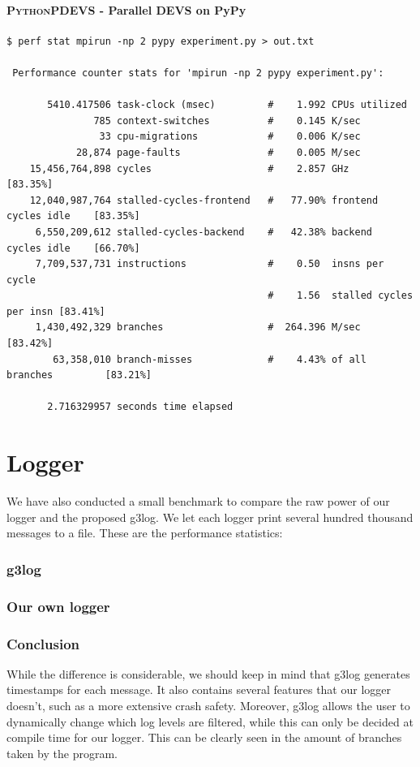 \documentclass[8pt,a4paper]{report}
\begin{document}
\paragraph{\textsc{PythonPDEVS} - Parallel DEVS on PyPy}
\begin{Verbatim}[fontsize=\small]
$ perf stat mpirun -np 2 pypy experiment.py > out.txt

 Performance counter stats for 'mpirun -np 2 pypy experiment.py':

       5410.417506 task-clock (msec)         #    1.992 CPUs utilized          
               785 context-switches          #    0.145 K/sec                  
                33 cpu-migrations            #    0.006 K/sec                  
            28,874 page-faults               #    0.005 M/sec                  
    15,456,764,898 cycles                    #    2.857 GHz                     [83.35%]
    12,040,987,764 stalled-cycles-frontend   #   77.90% frontend cycles idle    [83.35%]
     6,550,209,612 stalled-cycles-backend    #   42.38% backend  cycles idle    [66.70%]
     7,709,537,731 instructions              #    0.50  insns per cycle        
                                             #    1.56  stalled cycles per insn [83.41%]
     1,430,492,329 branches                  #  264.396 M/sec                   [83.42%]
        63,358,010 branch-misses             #    4.43% of all branches         [83.21%]

       2.716329957 seconds time elapsed
\end{Verbatim}

\section{Logger}
We have also conducted a small benchmark to compare the raw power of our logger and the proposed g3log.
We let each logger print several hundred thousand messages to a file. These are the performance statistics:
\subsubsection{g3log}

\subsubsection{Our own logger}

\subsubsection{Conclusion}
While the difference is considerable, we should keep in mind that g3log generates timestamps for each message. It also contains several features that our logger doesn't, such as a more extensive crash safety. Moreover, g3log allows the user to dynamically change which log levels are filtered, while this can only be decided at compile time for our logger. This can be clearly seen in the amount of branches taken by the program.
\end{document}
